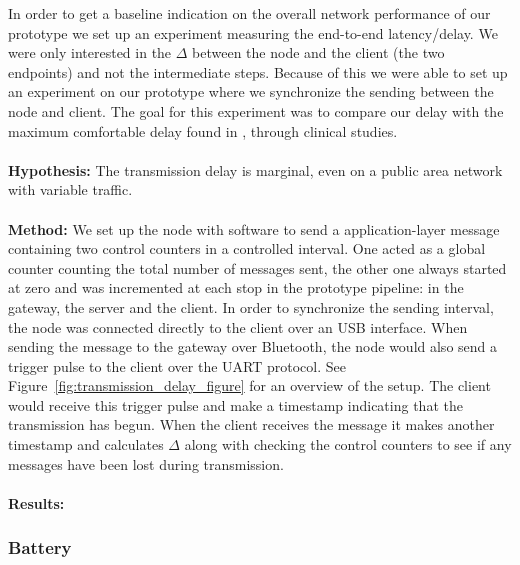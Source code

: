 In order to get a baseline indication on the overall network performance of our prototype we set up an experiment measuring the end-to-end latency/delay. We were only interested in the $\Delta$ between the node and the client (the two endpoints) and not the intermediate steps. Because of this we were able to set up an experiment on our prototype where we synchronize the sending between the node and client. The goal for this experiment was to compare our delay with the maximum comfortable delay found in \cite{Alesanco:2010kc}, through clinical studies.
\\
\\
\noindent
\textbf{Hypothesis:} The transmission delay is marginal, even on a public area network with variable traffic.
\\
\\
\noindent
\textbf{Method:} We set up the node with software to send a application-layer message containing two control counters in a controlled interval. One acted as a global counter counting the total number of messages sent, the other one always started at zero and was incremented at each stop in the prototype pipeline: in the gateway, the server and the client. In order to synchronize the sending interval, the node was connected directly to the client over an USB interface. When sending the message to the gateway over Bluetooth, the node would also send a trigger pulse to the client over the UART protocol. See Figure~\ref{fig:transmission_delay_figure} for an overview of the setup. The client would receive this trigger pulse and make a timestamp indicating that the transmission has begun. When the client receives the message it makes another timestamp and calculates $\Delta$ along with checking the control counters to see if any messages have been lost during transmission.
\\
\\
\noindent
\textbf{Results:} 


\subsubsection{Battery} %
\label{ssub:battery}

